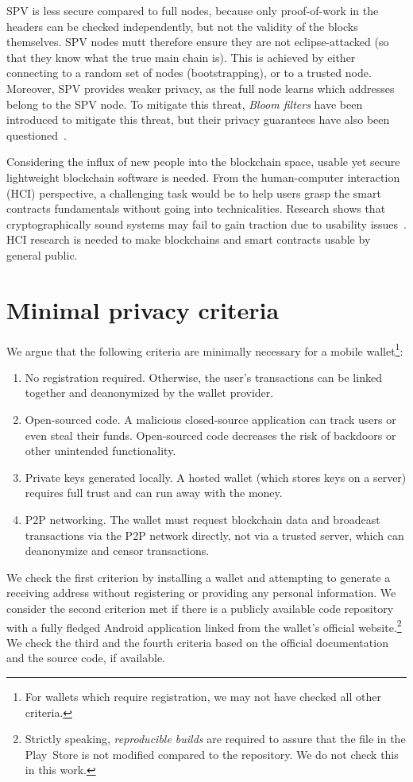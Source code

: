 SPV is less secure compared to full nodes, because only proof-of-work in the headers can be checked independently, but not the validity of the blocks themselves.
SPV nodes mutt therefore ensure they are not eclipse-attacked (so that they know what the true main chain is).
This is achieved by either connecting to a random set of nodes (bootstrapping), or to a trusted node.
Moreover, SPV provides weaker privacy, as the full node learns which addresses belong to the SPV node.
To mitigate this threat, \textit{Bloom filters} have been introduced to mitigate this threat, but their privacy guarantees have also been questioned~\cite{Gervais2014}.

Considering the influx of new people into the blockchain space, usable yet secure lightweight blockchain software is needed.
From the human-computer interaction (HCI) perspective, a challenging task would be to help users grasp the smart contracts fundamentals without going into technicalities.
Research shows that cryptographically sound systems may fail to gain traction due to usability issues~\cite{Ruoti2015}.
HCI research is needed to make blockchains and smart contracts usable by general public.


\section{Minimal privacy criteria} \label{section:Ch04Initialprivacycriteria}

We argue that the following criteria are minimally necessary for a mobile wallet\footnote{For wallets which require registration, we may not have checked all other criteria.}:
\begin{enumerate}
	\item No registration required. Otherwise, the user's transactions can be linked together and deanonymized by the wallet provider. 
	\item Open-sourced code. A malicious closed-source application can track users or even steal their funds. Open-sourced code decreases the risk of backdoors or other unintended functionality. 
	\item Private keys generated locally. A hosted wallet (which stores keys on a server) requires full trust and can run away with the money.
	\item P2P networking. The wallet must request blockchain data and broadcast transactions via the P2P network directly, not via a trusted server, which can deanonymize and censor transactions.
\end{enumerate}
We check the first criterion by installing a wallet and attempting to generate a receiving address without registering or providing any personal information.
We consider the second criterion met if there is a publicly available code repository with a fully fledged Android application linked from the wallet's official website.\footnote{Strictly speaking, \textit{reproducible builds} are required to assure that the file in the Play~Store is not modified compared to the repository. We do not check this in this work.}
We check the third and the fourth criteria based on the official documentation and the source code, if available.

